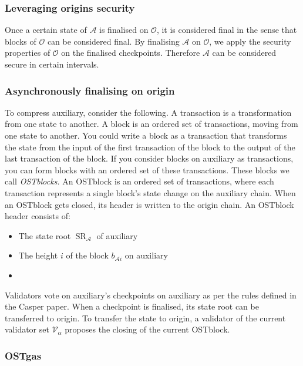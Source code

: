 \documentclass[12pt,a4paper,draft]{article}
\newcommand{\A}{\mathcal{A}}
\newcommand{\OC}{\mathcal{O}}
\newcommand{\V}{\mathcal{V}}
\newcommand{\SR}{\operatorname{SR}}
\begin{document}
\subsubsection{Leveraging origins security}

Once a certain state of $\A$ is finalised on $\OC$, it is considered final in the sense that blocks of $\OC$ can be considered final.
By finalising $\A$ on $\OC$, we apply the security properties of $\OC$ on the finalised checkpoints.
Therefore $\A$ can be considered secure in certain intervals.

\subsubsection{Asynchronously finalising on origin}

To compress auxiliary, consider the following.
A transaction is a transformation from one state to another.
A block is an ordered set of transactions, moving from one state to another.
You could write a block as a transaction that transforms the state from the input of the first transaction of the block to the output of the last transaction of the block.
If you consider blocks on auxiliary as transactions, you can form blocks with an ordered set of these transactions.
These blocks we call \emph{OSTblocks.}
An OSTblock is an ordered set of transactions, where each transaction represents a single block's state change on the auxiliary chain.
When an OSTblock gets closed, its header is written to the origin chain.
An OSTblock header consists of:
\begin{itemize}
	\item The state root $\SR_\A$ of auxiliary
	\item The height $i$ of the block $b_{\A{}i}$ on auxiliary
	\item %
\end{itemize}

Validators vote on auxiliary's checkpoints on auxiliary as per the rules defined in the Casper paper.
When a checkpoint is finalised, its state root can be transferred to origin.
To transfer the state to origin, a validator of the current validator set $\V_\alpha$ proposes the closing of the current OSTblock.


\subsubsection{OSTgas}
\end{document}
